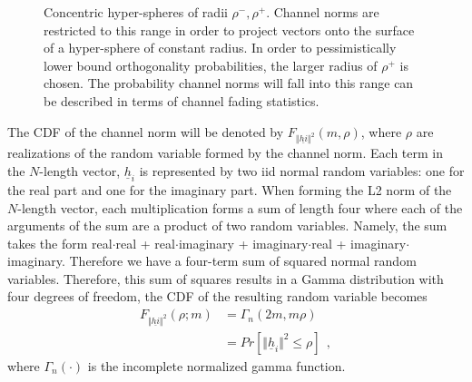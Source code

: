 \begin{figure}
    \centering
      \caption{Concentric hyper-spheres of radii $\rho^-,\rho^+$. Channel norms are restricted to this range in order to project vectors onto the surface of a hyper-sphere of constant radius. In order to pessimistically lower bound orthogonality probabilities, the larger radius of $\rho^+$ is chosen. The probability channel norms will fall into this range can be described in terms of channel fading statistics.}
    \label{fig:concentric_sphere}
\end{figure}
  
The CDF of the channel norm will be denoted by $F_{\Vert\underline{hi}\Vert^2}(m,\rho)$, where $\rho$ are realizations of the random variable formed by the channel norm. Each term in the $N$-length vector, $\underline{h}_i$ is represented by two iid normal random variables: one for the real part and one for the imaginary part. When forming the L2 norm of the $N$-length vector, each multiplication forms a sum of length four where each of the arguments of the sum are a product of two random variables. Namely, the sum takes the form real$\cdot$real + real$\cdot$imaginary + imaginary$\cdot$real + imaginary$\cdot$imaginary. Therefore we have a four-term sum of squared normal random variables. Therefore, this sum of squares results in a Gamma distribution with four degrees of freedom, the CDF of the resulting random variable becomes
\begin{equation}\label{eq:ch_sq_cdf_chan}
    \begin{aligned}
        F_{\Vert\underline{hi}\Vert^2}(\rho;m)& = \Gamma_n(2m,m\rho)\\
        &= Pr[\Vert\underline{h}_i\Vert^2 \leq \rho] \ \ ,
    \end{aligned}
\end{equation}
where $\Gamma_n(\cdot)$ is the incomplete normalized gamma function.

